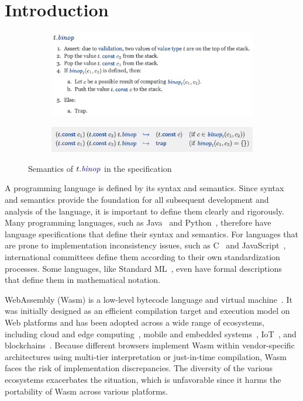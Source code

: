 \section{Introduction}\label{sec:intro}
\begin{figure}[t]
  \centering
  \begin{subfigure}{\textwidth}
    \centering
    \includegraphics[width=.7\textwidth]{../img/spec-prose.png}
\vspace*{-1em}
\vspace*{.5em}
  \end{subfigure}
  \begin{subfigure}{\textwidth}
    \centering
    \includegraphics[width=.7\textwidth]{../img/spec-formal.png}
  \end{subfigure}
\caption{Semantics of \ensuremath{t.\mathit{\inblue{binop}}} in the specification}
\label{fig:spec}
\end{figure}

A programming language is defined by its syntax and semantics.
Since syntax and semantics provide the foundation for all subsequent development and
analysis of the language, it is important to define them clearly and rigorously. 
Many programming languages, such as Java~\cite{javaspec} and Python~\cite{pythonspec},
therefore have language specifications that define their syntax and semantics.
For languages that are prone to implementation inconsistency issues,
such as C~\cite{cstandard} and JavaScript~\cite{ecmascript},
international committees define them according to their own standardization processes.
Some languages, like Standard ML~\cite{sml}, even have formal descriptions
that define them in mathematical notation.

WebAssembly (Wasm) is a low-level bytecode language and virtual machine~\cite{wasmspec}.
It was initially designed as an efficient compilation target and execution model on Web platforms
and has been adopted across a wide range of ecosystems,
including cloud and edge computing~\cite{lucet, cloudflare}, 
mobile and embedded systems~\cite{wasm-embedded}, IoT~\cite{wasm-iot}, and
blockchains~\cite{wasm-blockchain}.
Because different browsers implement Wasm within vendor-specific architectures
using multi-tier interpretation or just-in-time compilation,
Wasm faces the risk of implementation discrepancies.
The diversity of the various ecosystems exacerbates the situation,
which is unfavorable since it harms the portability of Wasm across various platforms.


